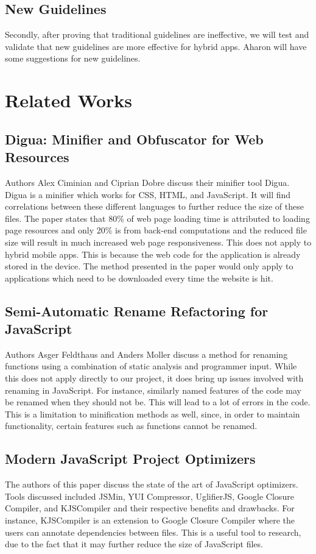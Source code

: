 \documentclass{acm_proc_article-sp}
\begin{document}
\subsection{New Guidelines}
Secondly, after proving that traditional guidelines are ineffective, we will test and validate that new guidelines are more effective for hybrid apps. Aharon will have some suggestions for new guidelines.

\section{Related Works}

\subsection{Digua: Minifier and Obfuscator for Web Resources\cite{ciminiandigua} }
Authors Alex Ciminian and Ciprian Dobre discuss their minifier tool Digua.  Digua is a minifier which works for CSS, HTML, and JavaScript.  It will find correlations between these different languages to further reduce the size of these files.  The paper states that 80\% of web page loading time is attributed to loading page resources and only 20\% is from back-end computations and the reduced file size will result in much increased web page responsiveness.  This does not apply to hybrid mobile apps.  This is because the web code for the application is already stored in the device.  The method presented in the paper would only apply to applications which need to be downloaded every time the website is hit. 



\subsection{Semi-Automatic Rename Refactoring for JavaScript\cite{feldthaus2013semi}}
Authors Asger Feldthaus and Anders Moller discuss a method for renaming functions using a combination of static analysis and programmer input.  While this does not apply directly to our project, it does bring up issues involved with renaming in JavaScript.  For instance, similarly named features of the code may be renamed when they should not be.  This will lead to a lot of errors in the code.  This is a limitation to minification methods as well, since, in order to maintain functionality, certain features such as functions cannot be renamed.

\subsection{Modern JavaScript Project Optimizers\cite{zolotareva2014modern} }
The authors of this paper discuss the state of the art of JavaScript optimizers.  Tools discussed included JSMin, YUI Compressor, UglifierJS, Google Closure Compiler, and KJSCompiler and their respective benefits and drawbacks.  For instance, KJSCompiler is an extension to Google Closure Compiler where the users can annotate dependencies between files.  This is a useful tool to research, due to the fact that it may further reduce the size of JavaScript files.
\end{document}
